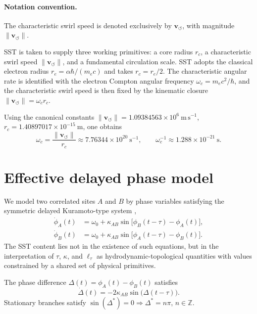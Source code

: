 \documentclass[11pt]{article}
\newcommand{\vnorm}{\lVert \mathbf{v}_{\!\boldsymbol{\circlearrowleft}}\rVert}
\newcommand{\rc}{r_c}
\begin{document}
\paragraph{Notation convention.}
The characteristic swirl speed is denoted exclusively by $\mathbf{v}_{\!\boldsymbol{\circlearrowleft}}$, with magnitude $\vnorm$.

SST is taken to supply three working primitives: a core radius $\rc$, a characteristic swirl speed $\vnorm$, and a fundamental circulation scale. SST adopts the classical electron radius $r_e = \alpha\hbar/(m_e c)$ and takes $\rc = r_e/2$. The characteristic angular rate is identified with the electron Compton angular frequency $\omega_c = m_e c^2/\hbar$, and the characteristic swirl speed is then fixed by the kinematic closure $\vnorm = \omega_c \rc$.

Using the canonical constants $\vnorm = 1.09384563\times 10^6~\mathrm{m\,s^{-1}}$, $\rc = 1.40897017\times 10^{-15}~\mathrm{m}$, one obtains
\begin{equation}
    \omega_c = \frac{\vnorm}{\rc} \approx 7.76344\times 10^{20}~\mathrm{s^{-1}}, \qquad
    \omega_c^{-1} \approx 1.288\times 10^{-21}~\mathrm{s}.
    \label{eq:omega_c}
\end{equation}

\section{Effective delayed phase model}

We model two correlated sites $A$ and $B$ by phase variables satisfying the symmetric delayed Kuramoto-type system \cite{Yeung1999},
\begin{align}
    \dot{\phi}_A(t) &= \omega_0 + \kappa_{AB}\sin\!\big[\phi_B(t-\tau) - \phi_A(t)\big], \label{eq:phiA}\\
    \dot{\phi}_B(t) &= \omega_0 + \kappa_{AB}\sin\!\big[\phi_A(t-\tau) - \phi_B(t)\big]. \label{eq:phiB}
\end{align}
The SST content lies not in the existence of such equations, but in the interpretation of $\tau$, $\kappa$, and $\ell_\tau$ as hydrodynamic-topological quantities with values constrained by a shared set of physical primitives.

The phase difference $\Delta(t) = \phi_A(t) - \phi_B(t)$ satisfies
\begin{equation}
    \dot{\Delta}(t) = -2\kappa_{AB}\sin\!\big(\Delta(t-\tau)\big).
    \label{eq:deltaeq}
\end{equation}
Stationary branches satisfy $\sin(\Delta^\ast) = 0 \Rightarrow \Delta^\ast = n\pi$, $n\in\mathbb{Z}$.
\end{document}
